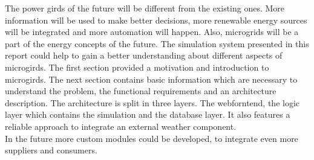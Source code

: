 The power girds of the future will be different from the existing ones. More information will be used to make better decisions, more renewable energy sources will be integrated and more automation will happen. Also, microgrids will be a part of the energy concepts of the future. The simulation system presented in this report could help to gain a better understanding about different aspects of microgirds. The first section provided a motivation and introduction to microgirds. The next section contains basic information which are necessary to understand the problem, the functional requirements and an architecture description. The architecture is split in three layers. The webforntend, the logic layer which contains the simulation and the database layer. It also features a reliable approach to integrate an external weather component.\\

\noindent In the future more custom modules could be developed, to integrate even more suppliers and consumers.
